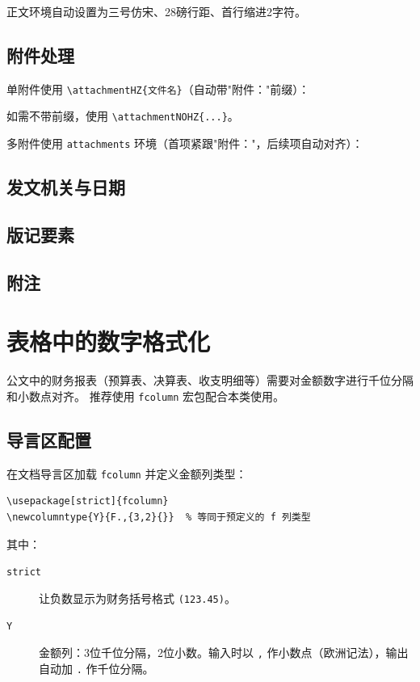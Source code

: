 \documentclass[redline, titleindent, zhlineskip]{gbt9704}
\begin{document}
正文环境自动设置为三号仿宋、28磅行距、首行缩进2字符。

\subsection{附件处理}
单附件使用 \verb|\attachmentHZ{文件名}|（自动带"附件："前缀）：

如需不带前缀，使用 \verb|\attachmentNOHZ{...}|。

多附件使用 \texttt{attachments} 环境（首项紧跟"附件："，后续项自动对齐）：
\begin{attachments}
\end{attachments}

\subsection{发文机关与日期}
\signature{中华人民共和国某部}

\subsection{版记要素}
\seprule
{}

\subsection{附注}

\section{表格中的数字格式化}

公文中的财务报表（预算表、决算表、收支明细等）需要对金额数字进行千位分隔和小数点对齐。
推荐使用 \texttt{fcolumn} 宏包配合本类使用。

\subsection{导言区配置}
在文档导言区加载 \texttt{fcolumn} 并定义金额列类型：
\begin{verbatim}
\usepackage[strict]{fcolumn}
\newcolumntype{Y}{F.,{3,2}{}}  % 等同于预定义的 f 列类型
\end{verbatim}

其中：
\begin{description}
  \item[\texttt{strict}] 让负数显示为财务括号格式 \texttt{(123.45)}。
  \item[\texttt{Y}] 金额列：3位千位分隔，2位小数。输入时以 \texttt{,} 作小数点（欧洲记法），输出自动加 \texttt{.} 作千位分隔。
\end{description}
\end{document}
